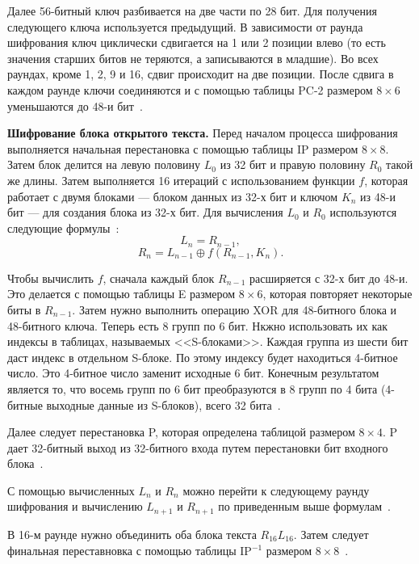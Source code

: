 \documentclass{bmstu}
\begin{document}
Далее 56-битный ключ разбивается на две части по 28 бит. 
Для получения следующего ключа используется предыдущий. 
В зависимости от раунда шифрования ключ циклически сдвигается на 1 или 2 позиции влево (то есть значения старших битов не теряются, а записываются в младшие). 
Во всех раундах, кроме 1, 2, 9 и 16, сдвиг происходит на две позиции. 
После сдвига в каждом раунде ключи соединяются и с помощью таблицы PC-2 размером $8 \times 6$ уменьшаются до 48-и бит~\cite{grabbe}.

\textbf{Шифрование блока открытого текста.} 
Перед началом процесса шифрования выполняется начальная перестановка с помощью таблицы IP размером $8 \times 8$. 
Затем блок делится на левую половину $L_0$ из 32 бит и правую половину $R_0$ такой же длины. 
Затем выполняется 16 итераций с использованием функции $f$, которая работает с двумя блоками --- блоком данных из 32-х бит и ключом $K_n$ из 48-и бит --- для создания блока из 32-х бит. 
Для вычисления $L_0$ и $R_0$ используются следующие формулы~\cite{grabbe}:
\begin{equation}
L_n = R_{n - 1},
\end{equation}
\begin{equation}
R_n = L_{n - 1} \oplus f(R_{n - 1}, K_n).
\end{equation}

Чтобы вычислить $f$, сначала каждый блок $R_{n - 1}$ расширяется с 32-х бит до 48-и. 
Это делается с помощью таблицы E размером $8 \times 6$, которая повторяет некоторые биты в $R_{n - 1}$. 
Затем нужно выполнить операцию XOR для 48-битного блока и 48-битного ключа. 
Теперь есть 8 групп по 6 бит. 
Нкжно использовать их как индексы в таблицах, называемых <<S-блоками>>. 
Каждая группа из шести бит даст индекс в отдельном S-блоке. 
По этому индексу будет находиться 4-битное число. 
Это 4-битное число заменит исходные 6 бит. 
Конечным результатом является то, что восемь групп по 6 бит преобразуются в 8 групп по 4 бита (4-битные выходные данные из S-блоков), всего 32 бита~\cite{grabbe}.

Далее следует перестановка P, которая определена таблицой размером $8 \times 4$. 
P дает 32-битный выход из 32-битного входа путем перестановки бит входного блока~\cite{grabbe}.

С помощью вычисленных $L_n$ и $R_n$ можно перейти к следующему раунду шифрования и вычислению $L_{n + 1}$ и $R_{n + 1}$ по приведенным выше формулам~\cite{grabbe}.

В 16-м раунде нужно объединить оба блока текста $R_{16}L_16$. 
Затем следует финальная переставновка с помощью таблицы IP$^{-1}$ размером $8 \times 8$~\cite{grabbe}.
\end{document}
